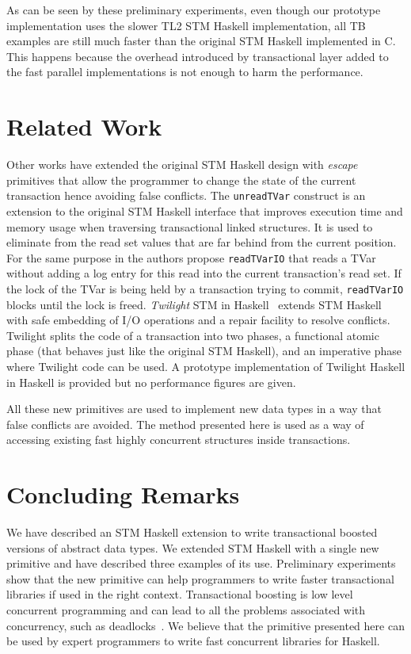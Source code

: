 \documentclass{llncs}
\begin{document}
As can be seen by these preliminary experiments, even though our prototype implementation uses 
the slower TL2 STM Haskell implementation, all TB examples are still
much faster than the original STM Haskell implemented in C. This happens because the overhead introduced by 
transactional layer added
to the fast parallel implementations is not enough to harm the performance.  

\section{Related Work}
\label{sec:relatedwork}

Other works have extended the original STM Haskell design with {\it escape} primitives that
allow the programmer to change the state of the current transaction hence avoiding false
conflicts. The {\tt unreadTVar} \cite{unreadtvar} construct is an extension to the original STM Haskell interface
that improves execution time and memory usage when traversing transactional linked
structures. It is used to eliminate from the read set values that are far behind from the
current position. For the same purpose in \cite{linkedlist} the authors propose
{\tt readTVarIO} that reads a TVar without adding a log entry for this read into the current transaction's read set. If the
lock of  the TVar is being held by a transaction trying to commit, {\tt readTVarIO} blocks
until the lock is freed. 
{\it Twilight} STM in Haskell~\cite{twilight} extends STM Haskell with safe embedding of I/O
operations and a repair facility to resolve conflicts. Twilight splits the code of a transaction
into two phases, a functional atomic phase (that behaves just like the original STM Haskell), and
an imperative phase where Twilight code can be used. A prototype implementation of Twilight Haskell in Haskell
is provided but no performance figures are given.

All these new primitives are used to implement new data types in a way that false conflicts
are avoided. The method presented here is used as a way of accessing existing fast highly concurrent
structures inside transactions.

\section{Concluding Remarks}
\label{sec:conclusions}

We have described an STM Haskell extension to write transactional boosted versions of
abstract data types. We extended STM Haskell with a single new primitive and have
described three examples of its use. Preliminary experiments show that the new
primitive can help programmers to write faster transactional libraries if used in the
right context. Transactional boosting is low level concurrent programming and can lead to
all the problems associated with concurrency, such as deadlocks~\cite{tboosting}. We
believe that the primitive presented here can be used by expert programmers to write fast
concurrent libraries for Haskell.
\end{document}
